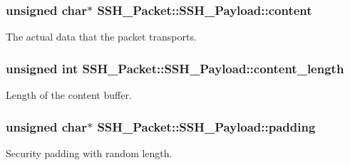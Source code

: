 \subsubsection[{\texorpdfstring{content}{content}}]{\setlength{\rightskip}{0pt plus 5cm}unsigned char$\ast$ S\+S\+H\+\_\+\+Packet\+::\+S\+S\+H\+\_\+\+Payload\+::content}\hypertarget{structSSH__Packet_1_1SSH__Payload_a1032f8d26567fabcf8a4dc11d113523b}{}\label{structSSH__Packet_1_1SSH__Payload_a1032f8d26567fabcf8a4dc11d113523b}


The actual data that the packet transports. 

\subsubsection[{\texorpdfstring{content\+\_\+length}{content_length}}]{\setlength{\rightskip}{0pt plus 5cm}unsigned int S\+S\+H\+\_\+\+Packet\+::\+S\+S\+H\+\_\+\+Payload\+::content\+\_\+length}\hypertarget{structSSH__Packet_1_1SSH__Payload_ac9ee8ecb0b1c010959ffdd83ad36f5d4}{}\label{structSSH__Packet_1_1SSH__Payload_ac9ee8ecb0b1c010959ffdd83ad36f5d4}


Length of the content buffer. 

\subsubsection[{\texorpdfstring{padding}{padding}}]{\setlength{\rightskip}{0pt plus 5cm}unsigned char$\ast$ S\+S\+H\+\_\+\+Packet\+::\+S\+S\+H\+\_\+\+Payload\+::padding}\hypertarget{structSSH__Packet_1_1SSH__Payload_a15717400f2e8f8c8c10e955f86b391eb}{}\label{structSSH__Packet_1_1SSH__Payload_a15717400f2e8f8c8c10e955f86b391eb}


Security padding with random length. 

